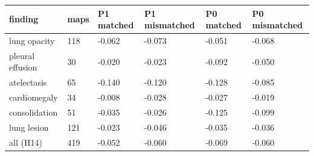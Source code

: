 \begin{tabular}{llllll}
\toprule
finding & maps & P1 matched & P1 mismatched & P0 matched & P0 mismatched \\
\midrule
lung opacity & 118 & -0.062 & -0.073 & -0.051 & -0.068 \\
pleural effusion & 30 & -0.020 & -0.023 & -0.092 & -0.050 \\
atelectasis & 65 & -0.140 & -0.120 & -0.128 & -0.085 \\
cardiomegaly & 34 & -0.008 & -0.028 & -0.027 & -0.019 \\
consolidation & 51 & -0.035 & -0.026 & -0.125 & -0.099 \\
lung lesion & 121 & -0.023 & -0.046 & -0.035 & -0.036 \\
all (H14) & 419 & -0.052 & -0.060 & -0.069 & -0.060 \\
\bottomrule
\end{tabular}
